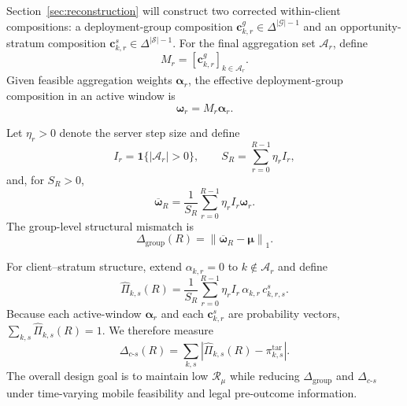 \documentclass[letterpaper,journal]{IEEEtran}
\begin{document}
Section~\ref{sec:reconstruction} will construct two corrected within-client
compositions: a deployment-group composition
$\mathbf{c}^{g}_{k,r}\in\Delta^{|\mathcal{G}|-1}$ and an opportunity-stratum
composition $\mathbf{c}^{s}_{k,r}\in\Delta^{|\mathcal{S}|-1}$.  For the final
aggregation set $\mathcal{A}_r$, define
\begin{equation}
    M_r
    =
    [\mathbf{c}^{g}_{k,r}]_{k\in\mathcal{A}_r}.
    \label{eq:Mr_def}
\end{equation}
Given feasible aggregation weights $\boldsymbol\alpha_r$, the effective
deployment-group composition in an active window is
\begin{equation}
    \boldsymbol\omega_r=M_r\boldsymbol\alpha_r.
    \label{eq:omega_r}
\end{equation}

Let $\eta_r>0$ denote the server step size and define
\begin{equation}
    I_r=\mathbf{1}\{|\mathcal{A}_r|>0\},
    \qquad
    S_R=\sum_{r=0}^{R-1}\eta_r I_r,
    \label{eq:active_mass}
\end{equation}
and, for $S_R>0$,
\begin{equation}
    \overline{\boldsymbol\omega}_R
    =
    \frac{1}{S_R}
    \sum_{r=0}^{R-1}
    \eta_r I_r\boldsymbol\omega_r.
    \label{eq:omega_bar}
\end{equation}
The group-level structural mismatch is
\begin{equation}
    \Delta_{\mathrm{group}}(R)
    =
    \left\|
    \overline{\boldsymbol\omega}_R-\boldsymbol\mu
    \right\|_1.
    \label{eq:delta_group}
\end{equation}

For client--stratum structure, extend $\alpha_{k,r}=0$ to
$k\notin\mathcal{A}_r$ and define
\begin{equation}
 \widehat\Pi_{k,s}(R)
 =
 \frac{1}{S_R}
 \sum_{r=0}^{R-1}
 \eta_r I_r\,
 \alpha_{k,r}\,
 c^{s}_{k,r,s}.
 \label{eq:Pi_hat_ks}
\end{equation}
Because each active-window $\boldsymbol\alpha_r$ and each
$\mathbf{c}^{s}_{k,r}$ are probability vectors,
$\sum_{k,s}\widehat\Pi_{k,s}(R)=1$.  We therefore measure
\begin{equation}
 \Delta_{c\text{-}s}(R)
 =
 \sum_{k,s}
 \left|
 \widehat\Pi_{k,s}(R)-\pi^{\mathrm{tar}}_{k,s}
 \right|.
 \label{eq:delta_cs}
\end{equation}
The overall design goal is to maintain low
$\mathcal{R}_{\mu}$ while reducing
$\Delta_{\mathrm{group}}$ and $\Delta_{c\text{-}s}$ under time-varying mobile
feasibility and legal pre-outcome information.
\end{document}

